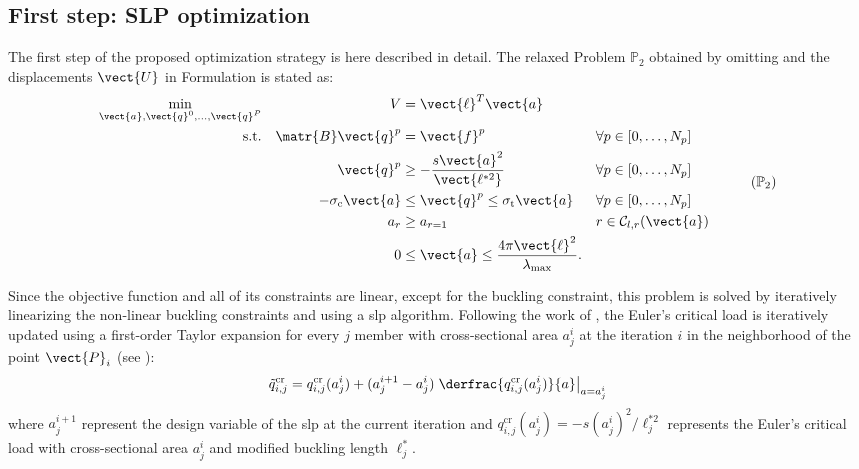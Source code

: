 \subsection{First step: SLP optimization}
The first step of the proposed optimization strategy is here described in detail. The relaxed Problem $\mathbb{P}_2$ obtained by omitting  and the displacements $\vect{U}$ in Formulation  is stated as:
\begin{equation}
    \begin{aligned}
    \min_{\vect{a}, \vect{q}^0, \dots, \vect{q}^P}  && V &= \vect{\ell}^{T}\vect{a}\\
    \textrm{s.t.}   && \matr{B}\vect{q}^p &= \vect{f}^p && \forall p \in [0,\dots,N_p]\\
    && \vect{q}^p &\geq -\frac{s\vect{a}^2}{\vect{\ell^{*2}}} && \forall p \in [0,\dots,N_p] \\
    && -\sigma_\text{c}\vect{a} &\leq \vect{q}^p \leq \sigma_\text{t}\vect{a} && \forall p \in [0,\dots,N_p] \\
    && a_{r}&\geq a_{r=1} && r \in \mathcal{C}_{l,r}(\vect{a}) \\
    && 0 &\leq \vect{a} \leq \frac{4 \pi \vect{\ell}^2}{\lambda_{\text{max}}}. \\
    \end{aligned}
    \tag{$\mathbb{P}_2$}
    \label{eq:04_optim_no_constr}
\end{equation}

Since the objective function and all of its constraints are linear, except for the buckling constraint, this problem is solved by iteratively linearizing the non-linear buckling constraints and using a \gls{slp} algorithm. Following the work of , the Euler's critical load is iteratively updated using a first-order Taylor expansion for every $j$ member with cross-sectional area $a_{j}^i$ at the iteration $i$ in the neighborhood of the point $\vect{P}_{i}$ (see ):
\begin{equation}
    \tilde{q}_{i,j}^{\text{cr}} = q_{i,j}^{\text{cr}}(a_{j}^i) + (a_{j}^{i+1} - a_{j}^i)\left.\derfrac{q_{i,j}^{\text{cr}}(a_{j}^i)}{a}\right\rvert_{a=a_{j}^i}
\end{equation}
where $a_{j}^{i+1}$ represent the design variable of the \gls{slp} at the current iteration and $q^{\text{cr}}_{i,j}(a_{j}^i) = -s ({a_{j}^i})^2/\ell^{*2}_j$ represents the Euler's critical load with cross-sectional area $a_{j}^i$ and modified buckling length $\ell^{*}_j$. 

